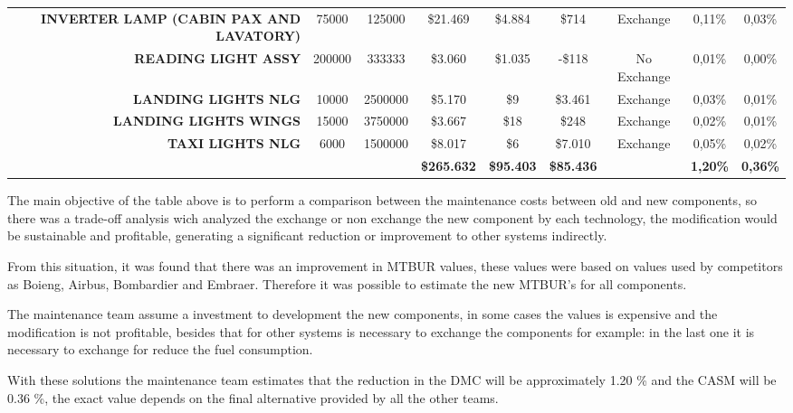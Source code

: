 \begin{table}[htbp]
\begin{tabular}{rcccccccc}
    \textbf{INVERTER LAMP (CABIN PAX AND LAVATORY)} & 75000 & 125000 & \$21.469 & \$4.884 & \$714 & Exchange & 0,11\% & 0,03\% \\
    \textbf{READING LIGHT ASSY} & 200000 & 333333 & \$3.060 & \$1.035 & -\$118 & No Exchange & 0,01\% & 0,00\% \\
    \textbf{LANDING LIGHTS NLG} & 10000 & 2500000 & \$5.170 & \$9   & \$3.461 & Exchange & 0,03\% & 0,01\% \\
    \textbf{LANDING LIGHTS WINGS} & 15000 & 3750000 & \$3.667 & \$18  & \$248 & Exchange & 0,02\% & 0,01\% \\
    \textbf{TAXI LIGHTS NLG} & 6000  & 1500000 & \$8.017 & \$6   & \$7.010 & Exchange & 0,05\% & 0,02\% \\
    \multicolumn{1}{c}{\textbf{}} & \textbf{} & \textbf{} & \textbf{\$265.632} & \textbf{\$95.403} & \textbf{\$85.436} & \textbf{} & \textbf{1,20\%} & \textbf{0,36\%} \\
    \bottomrule
    \end{tabular}%
  \label{tab:componentsMTBUR}%
\end{table}%

The main objective of the table above is to perform a comparison between the maintenance costs between old and new components, so there was a trade-off analysis wich analyzed the exchange or non exchange the new component by each technology, the modification would be sustainable and profitable, generating a significant reduction or improvement to other systems indirectly.

From this situation, it was found that there was an improvement in MTBUR values, these values were based on values used by competitors as Boieng, Airbus, Bombardier and Embraer. Therefore it was possible to estimate the new MTBUR's for all components.

The maintenance team assume a investment to development the new components, in some cases the values is expensive and the modification is not profitable, besides that for other systems is necessary to exchange the components for example: in the last one it is necessary to exchange for reduce the fuel consumption.

With these solutions the maintenance team estimates that the reduction in the DMC will be approximately 1.20 \% and the CASM will be 0.36 \%, the exact value depends on the final alternative provided by all the other teams.
